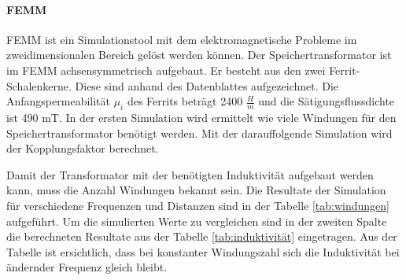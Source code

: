 \paragraph{FEMM}
FEMM ist ein Simulationstool mit dem elektromagnetische Probleme im zweidimensionalen Bereich gelöst werden können. Der Speichertransformator ist im FEMM achsensymmetrisch aufgebaut. Er besteht aus den zwei Ferrit-Schalenkerne. Diese sind anhand des Datenblattes aufgezeichnet. Die Anfangspermeabilität $ \mu_{i} $ des Ferrits beträgt 2400 $ \frac{H}{m} $ und die Sätigungsflussdichte ist 490 mT. In der ersten Simulation wird ermittelt wie viele Windungen für den Speichertransformator benötigt werden. Mit der darauffolgende Simulation wird der Kopplungsfaktor berechnet.

Damit der Transformator mit der benötigten Induktivität aufgebaut werden kann, muss die Anzahl Windungen bekannt sein. Die Resultate der Simulation für verschiedene Frequenzen und Distanzen sind in der Tabelle \ref{tab:windungen} aufgeführt. Um die simulierten Werte zu vergleichen sind in der zweiten Spalte die berechneten Resultate aus der Tabelle \ref{tab:induktivität} eingetragen. Aus der Tabelle ist ersichtlich, dass bei konstanter Windungszahl sich die Induktivität bei ändernder Frequenz gleich bleibt.

